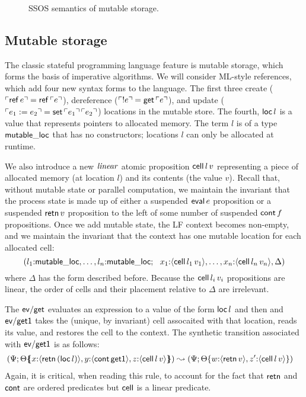 \begin{figure}[t]
\caption{SSOS semantics of mutable storage.}
\label{fig:ssos-mutable}
\end{figure}

\subsection{Mutable storage}
\label{sec:mutable-storage}

The classic stateful programming language feature is mutable storage,
which forms the basis of imperative algorithms. We will consider
ML-style references, which add four new syntax forms to the language.
The first three create (${\ulcorner{{\sf ref}\,e}\urcorner} = {\sf
  ref}\,{\ulcorner{e}\urcorner}$), dereference (${\ulcorner{{!}e}\urcorner} = {\sf
  get}\,{\ulcorner{e}\urcorner}$), and update (${\ulcorner{e_1 := e_2}\urcorner} = {\sf
  set}\,{\ulcorner{e_1}\urcorner}\,{\ulcorner{e_2}\urcorner}$) locations in the mutable
store. The fourth, ${\sf loc}\,l$ is a value that represents pointers
to allocated memory. The term $l$ is of a type ${\sf mutable\_loc}$
that has no constructors; locations $l$ can only be allocated at
runtime.

We also introduce a new ${\it linear}$ atomic proposition ${\sf
  cell}\,l\,v$ representing a piece of allocated memory (at location
$l$) and its contents (the value $v$). Recall that, without mutable
state or parallel computation, we maintain the invariant that the
process state is made up of either a suspended ${\sf eval}\,e$
proposition or a suspended ${\sf retn}\,v$ proposition to the left of
some number of suspended ${\sf cont}\,f$ propositions. Once we add
mutable state, the LF context becomes non-empty, and we maintain the
invariant that the context has one mutable location for each allocated
cell:
\[
(l_1{:}{\sf mutable\_loc}, \ldots, l_n{:}{\sf mutable\_loc}; ~~
 x_1{:}\langle {{\sf cell}\,l_1\,v_1} \rangle, \ldots, 
 x_n{:}\langle {{\sf cell}\,l_n\,v_n} \rangle, 
 \Delta)
\]
where $\Delta$ has the form described before. Because the ${\sf
  cell}\,l_i\,v_i$ propositions are linear, the order of cells and
their placement relative to $\Delta$ are irrelevant.

The ${\sf ev/get}$ evaluates an expression
to a value of the form ${\sf loc}\,l$ and then 
and ${\sf ev/get1}$ takes the (unique, by invariant) cell assocaited
with that location, reads its value, and restores the cell to the
context. The synthetic transition associated with ${\sf ev/get1}$ is 
as follows:
\begin{align*}
(\Psi&;  {\Theta}\mbox{$\{\hspace{-4pt}\{$}{x{:}\langle {{\sf retn}\,({\sf loc}\,l)} \rangle, y{:}\langle {{\sf cont}\,{\sf get1}} \rangle, z{:}\langle {{\sf cell}\,l\,v} \rangle}\mbox{$\}\hspace{-4pt}\}$})
\leadsto 
(\Psi; {\Theta}\{{w{:}\langle {{\sf retn}\,v} \rangle,
z'{:}\langle {{\sf cell}\,l\,v} \rangle}\})
\end{align*}
Again, it is critical, when reading this rule, to account for the fact
that ${\sf retn}$ and ${\sf cont}$ are ordered predicates but ${\sf
  cell}$ is a linear predicate.

